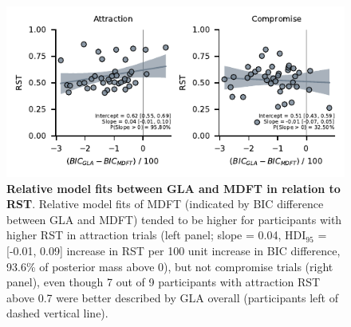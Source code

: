 \documentclass[11pt, a4paper]{article}
\begin{document}
\begin{figure}[ht!]
\begin{centering}
\includegraphics[scale=1]{../figures/S_GLA-vs-MDFT_dBIC_RST.pdf}
\caption{\textbf{Relative model fits between GLA and MDFT in relation to RST}. Relative model fits of MDFT (indicated by BIC difference between GLA and MDFT) tended to be higher for participants with higher RST in attraction trials (left panel; slope = 0.04, HDI$_{95}$ = [-0.01, 0.09] increase in RST per 100 unit increase in BIC difference, 93.6\% of posterior mass above 0), but not compromise trials (right panel), even though 7 out of 9 participants with attraction RST above 0.7 were better described by GLA overall (participants left of dashed vertical line).}
\label{fig:dbic-rst}
\end{centering}
\end{figure}
\newpage
\end{document}

